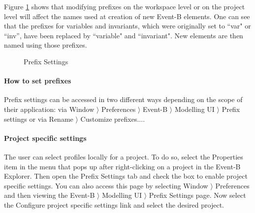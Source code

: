 Figure \ref{fig_ref_01_preferences1} shows that modifying prefixes on the workspace level or on the project level will affect the names used at creation of new Event-B elements. One can see that the prefixes for variables and invariants, which were originally set to ``var" or ``inv'', have been replaced by ``variable" and ``invariant". New elements are then named using those prefixes.

\ifinprint
\begin{figure}
  \begin{center}
    \caption{Prefix Settings}
    \label{fig_ref_01_preferences1}
  \end{center}
\end{figure}
\else
{}
\fi


\paragraph{How to set prefixes}

Prefix settings can be accessed in two different ways depending on the scope of their application: via \textsf{Window $\rangle$ Preferences $\rangle$ Event-B $\rangle$ Modelling UI $\rangle$ Prefix settings} or via \textsf{Rename $\rangle$ Customize prefixes...}.

\paragraph{Project specific settings}

The user can select profiles locally for a project. To do so, select the \textsf{Properties} item in the menu that pops up after right-clicking on a project in the \textsf{Event-B Explorer}. Then open the \textsf{Prefix Settings} tab and check the box to enable project specific settings. You can also access this page by selecting \textsf{Window $\rangle$ Preferences} and then viewing the \textsf{Event-B $\rangle$ Modelling UI $\rangle$ Prefix Settings} page. Now select the \textsf{Configure project specific settings} link and select the desired project. 

